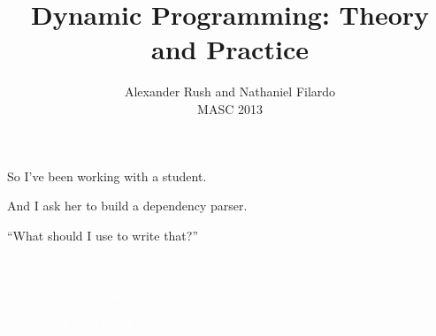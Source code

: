 \documentclass{beamer}
\title{Dynamic Programming: Theory and Practice}
\author{Alexander Rush and Nathaniel Filardo\\ MASC 2013}
\def\im#1#2{
  \node(#1) [scale=#2]{\pgfbox[center,top]{\pgfuseimage{#1}}
};}
\newcommand{\air}{\vspace{0.5cm}}
\begin{document}
\begin{frame}
  \titlepage
\end{frame}

\begin{frame}
  So I've been working with a student. 

  \pause
  \air

  And I ask her to build a dependency parser.

\air 
\pause  

  ``What should I use to write that?''
\end{frame}

\bgroup
{}

\begin{frame}[t]
  \begin{figure}
    \centering
  \end{figure}
  
  \vspace{6cm}

  \begin{center}
    \textcolor{white}{when I am in my advisor's class}    
  \end{center}

\end{frame}

\begin{frame}[t]
  \begin{figure}
    \centering
  \end{figure}

  \vspace{6cm}

  \begin{center}
    \textcolor{white}{when I read the paper}
  \end{center}

\end{frame}

\begin{frame}[t]
  \vspace{-1cm}
  \begin{figure}
    \centering
  \end{figure}

  \vspace{7.5cm}

  \begin{center}
    \textcolor{white}{when I look at the code}
  \end{center}
\end{frame}
\end{document}
